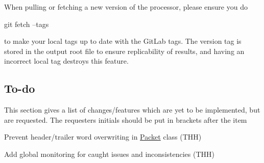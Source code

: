 When pulling or fetching a new version of the processor, please ensure you do 
\begin{DoxyCode}
git fetch --tags
\end{DoxyCode}
 to make your local tags up to date with the Git\+Lab tags. The version tag is stored in the output root file to ensure replicability of results, and having an incorrect local tag destroys this feature.

\subsection*{To-\/do}

This section gives a list of changes/features which are yet to be implemented, but are requested. The requester\textquotesingle{}s initials should be put in brackets after the item


\begin{DoxyItemize}
\item Prevent header/trailer word overwriting in \hyperlink{class_packet}{Packet} class (T\+HH)
\item Add global monitoring for caught issues and inconsistencies (T\+HH) 
\end{DoxyItemize}